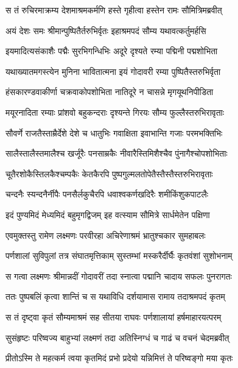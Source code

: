 \twolineshloka
{स तं रुचिरमाक्रम्य देशमाश्रमकर्मणि}
{हस्ते गृहीत्वा हस्तेन रामः सौमित्रिमब्रवीत्} %

\twolineshloka
{अयं देशः समः श्रीमान्पुष्पितैर्तरुभिर्वृतः}
{इहाश्रमपदं सौम्य यथावत्कर्तुमर्हसि} %

\twolineshloka
{इयमादित्यसंकाशैः पद्मैः सुरभिगन्धिभिः}
{अदूरे दृश्यते रम्या पद्मिनी पद्मशोभिता} %

\twolineshloka
{यथाख्यातमगस्त्येन मुनिना भावितात्मना}
{इयं गोदावरी रम्या पुष्पितैस्तरुभिर्वृता} %

\twolineshloka
{हंसकारण्डवाकीर्णा चक्रवाकोपशोभिता}
{नातिदूरे न चासन्ने मृगयूथनिपीडिता} %

\twolineshloka
{मयूरनादिता रम्याः प्रांशवो बहुकन्दराः}
{दृश्यन्ते गिरयः सौम्य फुल्लैस्तरुभिरावृताः} %

\twolineshloka
{सौवर्णे राजतैस्ताम्रैर्देशे देशे च धातुभिः}
{गवाक्षिता इवाभान्ति गजाः परमभक्तिभिः} %

\twolineshloka
{सालैस्तालैस्तमालैश्च खर्जूरैः पनसाम्रकैः}
{नीवारैस्तिमिशैश्चैव पुंनागैश्चोपशोभिताः} %

\twolineshloka
{चूतैरशोकैस्तिलकैश्चम्पकैः केतकैरपि}
{पुष्पगुल्मलतोपेतैस्तैस्तैस्तरुभिरावृताः} %

\twolineshloka
{चन्दनैः स्यन्दनैर्नीपैः पनसैर्लकुचैरपि}
{धवाश्वकर्णखदिरैः शमीकिंशुकपाटलैः} %

\twolineshloka
{इदं पुण्यमिदं मेध्यमिदं बहुमृगद्विजम्}
{इह वत्स्याम सौमित्रे सार्धमेतेन पक्षिणा} %

\twolineshloka
{एवमुक्तस्तु रामेण लक्ष्मणः परवीरहा}
{अचिरेणाश्रमं भ्रातुश्चकार सुमहाबलः} %

\twolineshloka
{पर्णशालां सुविपुलां तत्र संघातमृत्तिकाम्}
{सुस्तम्भां मस्करैर्दीर्घैः कृतवंशां सुशोभनाम्} %

\twolineshloka
{स गत्वा लक्ष्मणः श्रीमान्नदीं गोदावरीं तदा}
{स्नात्वा पद्मानि चादाय सफलः पुनरागतः} %

\twolineshloka
{ततः पुष्पबलिं कृत्वा शान्तिं च स यथाविधि}
{दर्शयामास रामाय तदाश्रमपदं कृतम्} %

\twolineshloka
{स तं दृष्ट्वा कृतं सौम्यमाश्रमं सह सीतया}
{राघवः पर्णशालायां हर्षमाहारयत्परम्} %

\twolineshloka
{सुसंहृष्टः परिष्वज्य बाहुभ्यां लक्ष्मणं तदा}
{अतिस्निग्धं च गाढं च वचनं चेदमब्रवीत्} %

\twolineshloka
{प्रीतोऽस्मि ते महत्कर्म त्वया कृतमिदं प्रभो}
{प्रदेयो यन्निमित्तं ते परिष्वङ्गो मया कृतः} %

